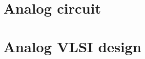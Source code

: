 \documentclass[12pt,a4paper,UTF8]{ctexbook}
\begin{document}
	\part{Analog circuit}
	\label{Analog circuit}
	
	\begin{comment} 
	rather stupid, but helpful 
	\chapter{Transistor circuit analysis}
	\label{Transistor circuit analysis}
	\chapter{Transistor circuit design}
	\label{Transistor circuit design}
	\chapter{FET circuit analysis}
	\label{FET circuit analysis}
	\chapter{FET circuit design}
	\label{FET circuit design}
	\end{comment}
	
	\part{Analog VLSI design}
	\label{Analog VLSI design}
	
	
	\begin{comment} 
	rather stupid, but helpful 
	\chapter{Current source}
	\label{Current source}
	\chapter{Current mirror}
	\label{Current mirror }
	\chapter{Differential amplifier pair}
	\label{Differential amplifier pair}
	\chapter{OP AMP design}
	\label{OP AMP design}
	\end{comment}
\end{document}
